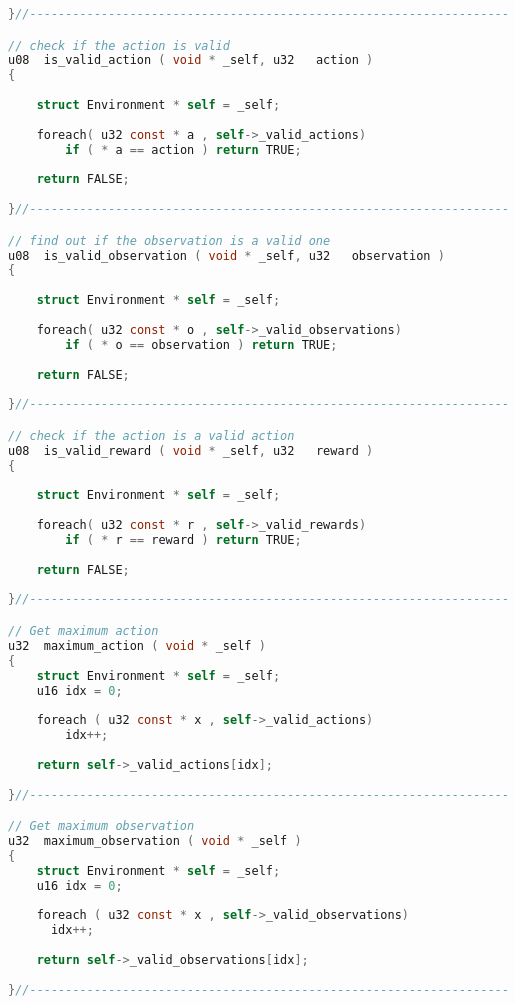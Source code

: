 \documentclass[fancychapters]{report}   	%
\begin{document}
\begin{lstlisting}[language=C,caption={environment.c}]
}//-------------------------------------------------------------------

// check if the action is valid
u08  is_valid_action ( void * _self, u32   action )
{
    
    struct Environment * self = _self;
    
    foreach( u32 const * a , self->_valid_actions)
        if ( * a == action ) return TRUE;
    
    return FALSE;
    
}//-------------------------------------------------------------------

// find out if the observation is a valid one
u08  is_valid_observation ( void * _self, u32   observation )
{
    
    struct Environment * self = _self;
    
    foreach( u32 const * o , self->_valid_observations)
        if ( * o == observation ) return TRUE;
    
    return FALSE;
    
}//-------------------------------------------------------------------

// check if the action is a valid action
u08  is_valid_reward ( void * _self, u32   reward )
{
    
    struct Environment * self = _self;
    
    foreach( u32 const * r , self->_valid_rewards)
        if ( * r == reward ) return TRUE;
    
    return FALSE;
    
}//-------------------------------------------------------------------

// Get maximum action
u32  maximum_action ( void * _self )
{
    struct Environment * self = _self;
    u16 idx = 0;
    
    foreach ( u32 const * x , self->_valid_actions)
        idx++;
    
    return self->_valid_actions[idx];
    
}//-------------------------------------------------------------------

// Get maximum observation
u32  maximum_observation ( void * _self )
{
    struct Environment * self = _self;
    u16 idx = 0;
    
    foreach ( u32 const * x , self->_valid_observations)
      idx++;
    
    return self->_valid_observations[idx];
    
}//-------------------------------------------------------------------



\end{lstlisting}
\end{document}
